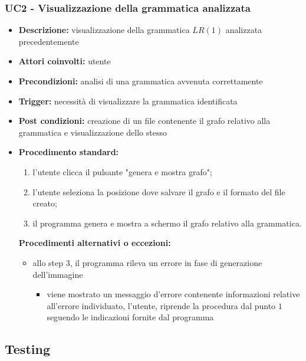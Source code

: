 \documentclass[12pt]{article}
\begin{document}
\subsubsection{UC2 - Visualizzazione della grammatica analizzata}
\begin{itemize}[label=]
\item \textbf{Descrizione:} visualizzazione della grammatica $LR\left( 1 \right)$ analizzata precedentemente
\item \textbf{Attori coinvolti:} utente
\item \textbf{Precondizioni:} analisi di una grammatica avvenuta correttamente
\item \textbf{Trigger:} necessità di visualizzare la grammatica identificata
\item \textbf{Post condizioni:} creazione di un file contenente il grafo relativo alla grammatica e visualizzazione dello stesso
\item \textbf{Procedimento standard:}
\begin{enumerate}[label=\arabic*.]
\item l'utente clicca il pulsante "genera e mostra grafo";
\item l'utente seleziona la posizione dove salvare il grafo e il formato del file creato;
\item il programma genera e mostra a schermo il grafo relativo alla grammatica.
\end{enumerate}
\textbf{Procedimenti alternativi o eccezioni:}
\begin{itemize}
\item allo step $3$, il programma rileva un errore in fase di generazione dell'immagine
\begin{itemize}[label=]
\item viene mostrato un messaggio d'errore contenente informazioni relative all'errore individuato, l'utente, riprende la procedura dal punto $1$ seguendo le indicazioni fornite dal programma
\end{itemize}
\end{itemize}
\end{itemize}
\pagebreak
\subsection{Testing}
\end{document}
